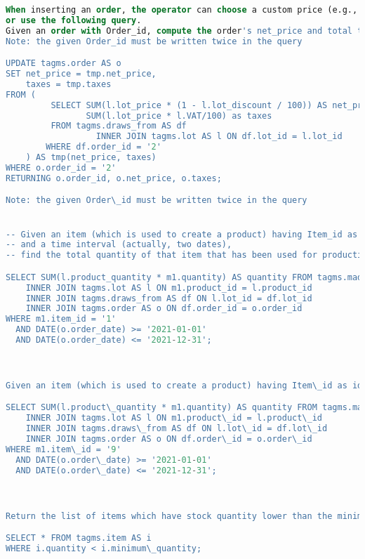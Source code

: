 \begin{lstlisting}[language=SQL,
keywordstyle=\color{blue},
stringstyle=\color{mauve},
showstringspaces=false,
basicstyle=\ttfamily\footnotesize]
When inserting an order, the operator can choose a custom price (e.g., decided with the customer)
or use the following query.
Given an order with Order_id, compute the order's net_price and total taxes.
Note: the given Order_id must be written twice in the query

UPDATE tagms.order AS o
SET net_price = tmp.net_price,
    taxes = tmp.taxes
FROM (
         SELECT SUM(l.lot_price * (1 - l.lot_discount / 100)) AS net_price,
                SUM(l.lot_price * l.VAT/100) as taxes
         FROM tagms.draws_from AS df
                  INNER JOIN tagms.lot AS l ON df.lot_id = l.lot_id
        WHERE df.order_id = '2'
    ) AS tmp(net_price, taxes)
WHERE o.order_id = '2'
RETURNING o.order_id, o.net_price, o.taxes;

Note: the given Order\_id must be written twice in the query


-- Given an item (which is used to create a product) having Item_id as identifier
-- and a time interval (actually, two dates),
-- find the total quantity of that item that has been used for production or packaging during that time.

SELECT SUM(l.product_quantity * m1.quantity) AS quantity FROM tagms.made_up_of_1 AS m1
    INNER JOIN tagms.lot AS l ON m1.product_id = l.product_id
    INNER JOIN tagms.draws_from AS df ON l.lot_id = df.lot_id
    INNER JOIN tagms.order AS o ON df.order_id = o.order_id
WHERE m1.item_id = '1'
  AND DATE(o.order_date) >= '2021-01-01'
  AND DATE(o.order_date) <= '2021-12-31';



Given an item (which is used to create a product) having Item\_id as identifier and a time interval (actually, two dates), find the total quantity of that item that has been used for production or packaging during that time.

SELECT SUM(l.product\_quantity * m1.quantity) AS quantity FROM tagms.made\_up\_of\_1 AS m1
    INNER JOIN tagms.lot AS l ON m1.product\_id = l.product\_id
    INNER JOIN tagms.draws\_from AS df ON l.lot\_id = df.lot\_id
    INNER JOIN tagms.order AS o ON df.order\_id = o.order\_id
WHERE m1.item\_id = '9'
  AND DATE(o.order\_date) >= '2021-01-01'
  AND DATE(o.order\_date) <= '2021-12-31';



Return the list of items which have stock quantity lower than the minimum one.

SELECT * FROM tagms.item AS i
WHERE i.quantity < i.minimum\_quantity;





\end{lstlisting}
